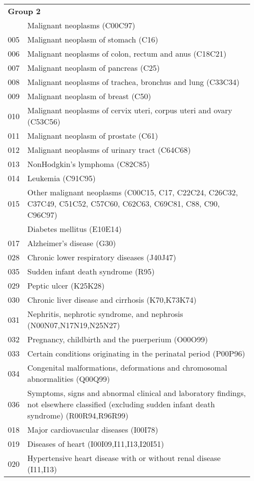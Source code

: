 \begin{longtable}{lp{11cm}}
\multicolumn{2}{l}{\textbf{Group 2}} \\
\addlinespace
004 & Malignant neoplasms (C00C97) \\
005 & Malignant neoplasm of stomach (C16) \\
006 & Malignant neoplasms of colon, rectum and anus (C18C21) \\
007 & Malignant neoplasm of pancreas (C25) \\
008 & Malignant neoplasms of trachea, bronchus and lung (C33C34) \\
009 & Malignant neoplasm of breast (C50) \\
010 & Malignant neoplasms of cervix uteri, corpus uteri and ovary (C53C56) \\
011 & Malignant neoplasm of prostate (C61) \\
012 & Malignant neoplasms of urinary tract (C64C68) \\
013 & NonHodgkin's lymphoma (C82C85) \\
014 & Leukemia (C91C95) \\
015 & Other malignant neoplasms (C00C15, C17, C22C24,  C26C32, C37C49, C51C52, C57C60, C62C63, C69C81, C88, C90, C96C97) \\
\addlinespace
016 & Diabetes mellitus (E10E14) \\
017 & Alzheimer's disease (G30) \\
028 & Chronic lower respiratory diseases (J40J47) \\
035 & Sudden infant death syndrome (R95) \\
029 & Peptic ulcer (K25K28) \\
030 & Chronic liver disease and cirrhosis (K70,K73K74) \\
031 & Nephritis, nephrotic syndrome, and nephrosis (N00N07,N17N19,N25N27) \\
032 & Pregnancy, childbirth and the puerperium (O00O99) \\
033 & Certain conditions originating in the perinatal period (P00P96) \\
034 & Congenital malformations, deformations and chromosomal abnormalities (Q00Q99) \\
036 & Symptoms, signs and abnormal clinical and laboratory findings, not elsewhere classified (excluding sudden infant death syndrome) (R00R94,R96R99) \\
018 & Major cardiovascular diseases (I00I78) \\
019 & Diseases of heart (I00I09,I11,I13,I20I51) \\
020 & Hypertensive heart disease with or without renal disease (I11,I13) \\

\end{longtable}
